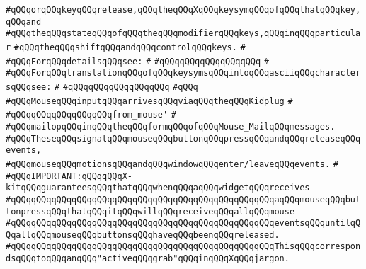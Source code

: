 \verb|#qQQqorqQQqkeyqQQqrelease,qQQqtheqQQqXqQQqkeysymqQQqofqQQqthatqQQqkey,qQQqand|\newline
\verb|#qQQqtheqQQqstateqQQqofqQQqtheqQQqmodifierqQQqkeys,qQQqinqQQqparticular|\newline
\verb|#qQQqtheqQQqshiftqQQqandqQQqcontrolqQQqkeys.|\newline
\verb|#|\newline
\verb|#qQQqForqQQqdetailsqQQqsee:|\newline
\verb|#|\newline
\verb|#qQQqqQQqqQQqqQQqqQQq|\newline
\verb|#|\newline
\verb|#qQQqForqQQqtranslationqQQqofqQQqkeysymsqQQqintoqQQqasciiqQQqcharactersqQQqsee:|\newline
\verb|#|\newline
\verb|#qQQqqQQqqQQqqQQqqQQq|\newline
\verb|#qQQq|\newline
\verb|#qQQqMouseqQQqinputqQQqarrivesqQQqviaqQQqtheqQQqKidplug|\newline
\verb|#|\newline
\verb|#qQQqqQQqqQQqqQQqqQQqfrom_mouse'|\newline
\verb|#|\newline
\verb|#qQQqmailopqQQqinqQQqtheqQQqformqQQqofqQQqMouse_MailqQQqmessages.|\newline
\verb|#qQQqTheseqQQqsignalqQQqmouseqQQqbuttonqQQqpressqQQqandqQQqreleaseqQQqevents,|\newline
\verb|#qQQqmouseqQQqmotionsqQQqandqQQqwindowqQQqenter/leaveqQQqevents.|\newline
\verb|#|\newline
\verb|#qQQqIMPORTANT:qQQqqQQqX-kitqQQqguaranteesqQQqthatqQQqwhenqQQqaqQQqwidgetqQQqreceives|\newline
\verb|#qQQqqQQqqQQqqQQqqQQqqQQqqQQqqQQqqQQqqQQqqQQqqQQqqQQqaqQQqmouseqQQqbuttonpressqQQqthatqQQqitqQQqwillqQQqreceiveqQQqallqQQqmouse|\newline
\verb|#qQQqqQQqqQQqqQQqqQQqqQQqqQQqqQQqqQQqqQQqqQQqqQQqqQQqeventsqQQquntilqQQqallqQQqmouseqQQqbuttonsqQQqhaveqQQqbeenqQQqreleased.|\newline
\verb|#qQQqqQQqqQQqqQQqqQQqqQQqqQQqqQQqqQQqqQQqqQQqqQQqqQQqThisqQQqcorrespondsqQQqtoqQQqanqQQq"activeqQQqgrab"qQQqinqQQqXqQQqjargon.|\newline

